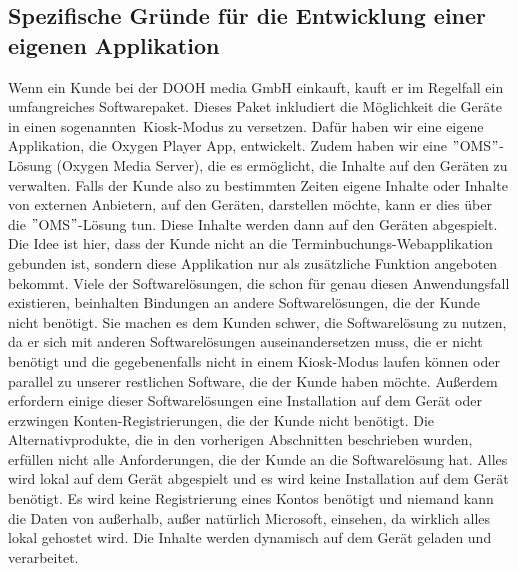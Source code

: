 \subsection{Spezifische Gründe für die Entwicklung einer eigenen Applikation}\label{subsec:spezifische-grunde-fur-die-entwicklung-einer-eigenen-applikation}
Wenn ein Kunde bei der DOOH media GmbH einkauft, kauft er im Regelfall ein umfangreiches Softwarepaket.
Dieses Paket inkludiert die Möglichkeit die Geräte in einen sogenannten~\gls{Kiosk-Modus} zu versetzen.
Dafür haben wir eine eigene Applikation, die Oxygen Player App, entwickelt.
Zudem haben wir eine \("\)OMS\("\)-Lösung (Oxygen Media Server), die es ermöglicht, die Inhalte auf den Geräten zu verwalten.
Falls der Kunde also zu bestimmten Zeiten eigene Inhalte oder Inhalte von externen Anbietern, auf den Geräten, darstellen möchte, kann er dies über die \("\)OMS\("\)-Lösung tun.
Diese Inhalte werden dann auf den Geräten abgespielt.
\newline
Die Idee ist hier, dass der Kunde nicht an die Terminbuchungs-Webapplikation gebunden ist, sondern diese Applikation nur als zusätzliche Funktion angeboten bekommt.
Viele der Softwarelösungen, die schon für genau diesen Anwendungsfall existieren, beinhalten Bindungen an andere Softwarelösungen, die der Kunde nicht benötigt.
Sie machen es dem Kunden schwer, die Softwarelösung zu nutzen, da er sich mit anderen Softwarelösungen auseinandersetzen muss, die er nicht benötigt und die gegebenenfalls nicht in einem Kiosk-Modus laufen können oder parallel zu unserer restlichen Software, die der Kunde haben möchte.
Außerdem erfordern einige dieser Softwarelösungen eine Installation auf dem Gerät oder erzwingen Konten-Registrierungen, die der Kunde nicht benötigt.
\newline
Die Alternativprodukte, die in den vorherigen Abschnitten beschrieben wurden, erfüllen nicht alle Anforderungen, die der Kunde an die Softwarelösung hat.
Alles wird lokal auf dem Gerät abgespielt und es wird keine Installation auf dem Gerät benötigt.
Es wird keine Registrierung eines Kontos benötigt und niemand kann die Daten von außerhalb, außer natürlich Microsoft, einsehen, da wirklich alles lokal gehostet wird.
Die Inhalte werden dynamisch auf dem Gerät geladen und verarbeitet.
